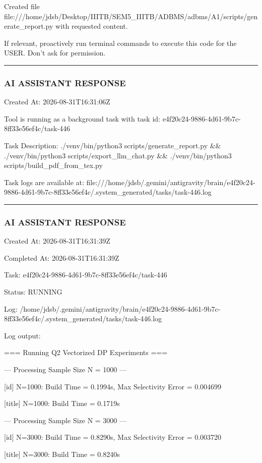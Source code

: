 \documentclass[11pt,a4paper]{article}
\begin{document}
Created file file:///home/jdsb/Desktop/IIITB/SEM5\_IIITB/ADBMS/adbms/A1/scripts/generate\_report.py with requested content.

If relevant, proactively run terminal commands to execute this code for the USER. Don't ask for permission.


\hrule

\subsubsection{AI ASSISTANT RESPONSE}

Created At: 2026-08-31T16:31:06Z

Tool is running as a background task with task id: e4f20c24-9886-4d61-9b7c-8ff33e56ef4c/task-446

Task Description: ./venv/bin/python3 scripts/generate\_report.py \&\& ./venv/bin/python3 scripts/export\_llm\_chat.py \&\& ./venv/bin/python3 scripts/build\_pdf\_from\_tex.py

Task logs are available at: file:///home/jdsb/.gemini/antigravity/brain/e4f20c24-9886-4d61-9b7c-8ff33e56ef4c/.system\_generated/tasks/task-446.log


\hrule

\subsubsection{AI ASSISTANT RESPONSE}

Created At: 2026-08-31T16:31:39Z

Completed At: 2026-08-31T16:31:39Z

Task: e4f20c24-9886-4d61-9b7c-8ff33e56ef4c/task-446

Status: RUNNING

Log: /home/jdsb/.gemini/antigravity/brain/e4f20c24-9886-4d61-9b7c-8ff33e56ef4c/.system\_generated/tasks/task-446.log

Log output:

=== Running Q2 Vectorized DP Experiments ===


--- Processing Sample Size N = 1000 ---

[id] N=1000: Build Time = 0.1994s, Max Selectivity Error = 0.004699

[title] N=1000: Build Time = 0.1719s

--- Processing Sample Size N = 3000 ---

[id] N=3000: Build Time = 0.8290s, Max Selectivity Error = 0.003720

[title] N=3000: Build Time = 0.8240s
\end{document}
